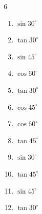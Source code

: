 \begin{multicols}{6}
\begin{enumerate}

  \item $\displaystyle \sin{30^\circ}$


  \item $\displaystyle \tan{30^\circ}$


  \item $\displaystyle \sin{45^\circ}$


  \item $\displaystyle \cos{60^\circ}$


  \item $\displaystyle \tan{30^\circ}$


  \item $\displaystyle \cos{45^\circ}$


  \item $\displaystyle \cos{60^\circ}$


\columnbreak %

  \item $\displaystyle \tan{45^\circ}$

        \phantom{$\displaystyle =1$}

  \item $\displaystyle \sin{30^\circ}$


  \item $\displaystyle \tan{45^\circ}$

        \phantom{$\displaystyle =1$}

  \item $\displaystyle \sin{45^\circ}$


  \item $\displaystyle \tan{30^\circ}$



\end{enumerate}
\end{multicols}
